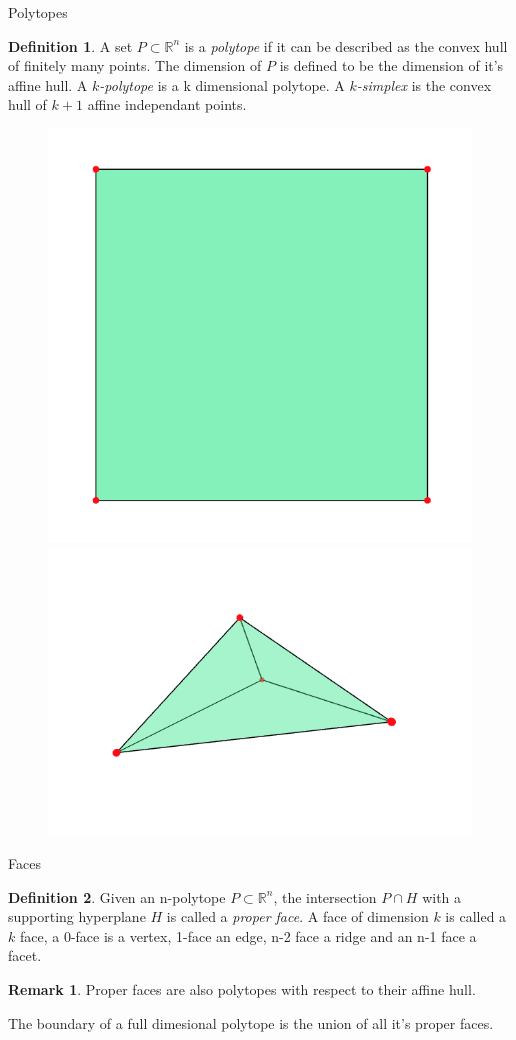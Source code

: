 \documentclass[9pt]{beamer}
\theoremstyle{definition}
\newtheorem*{remark}{Remark}
\newtheorem{defn}{Definition}
\begin{document}
\begin{frame}[fragile]{Polytopes}
  \begin{defn}
    A set $P \subset \mathbb{R}^n$ is a \emph{polytope} if it can be described
    as the convex hull of finitely many points. The dimension of $P$ is
    defined to be the dimension of it's affine hull. A \emph{$k$-polytope} is a
    k dimensional polytope. A \emph{$k$-simplex} is the convex hull of $k + 1$
    affine independant points.
  \end{defn}

  \begin{figure}
    \includegraphics[width=.30\textwidth, height=0.4\textheight]{images/square}
    \includegraphics[width=.30\textwidth, height=0.4\textheight]{images/simplex}
  \end{figure}

\end{frame}


\begin{frame}[fragile]{Faces}
  \begin{defn}
    Given an n-polytope $P \subset \mathbb{R}^n$, the intersection $P \cap H$
    with a supporting hyperplane $H$ is called a \emph{proper face}. A face of
    dimension $k$ is called a $k$ face, a 0-face is a vertex, 1-face an edge,
    n-2 face a ridge and an n-1 face a facet.
  \end{defn}
  \begin{remark}
    Proper faces are also polytopes with respect to their affine hull.
  \end{remark}
  \begin{theorem}
    The boundary of a full dimesional polytope is the union of all it's
    proper faces.
  \end{theorem}

\end{frame}
\end{document}
